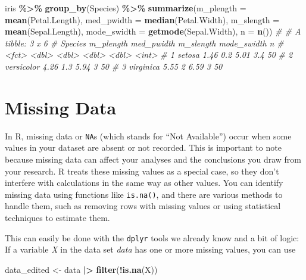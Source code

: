 \documentclass[
]{book}
\newenvironment{Shaded}{\begin{snugshade}}{\end{snugshade}}
\newcommand{\AttributeTok}[1]{\textcolor[rgb]{0.13,0.29,0.53}{#1}}
\newcommand{\CommentTok}[1]{\textcolor[rgb]{0.56,0.35,0.01}{\textit{#1}}}
\newcommand{\FunctionTok}[1]{\textcolor[rgb]{0.13,0.29,0.53}{\textbf{#1}}}
\newcommand{\NormalTok}[1]{#1}
\newcommand{\OtherTok}[1]{\textcolor[rgb]{0.56,0.35,0.01}{#1}}
\newcommand{\SpecialCharTok}[1]{\textcolor[rgb]{0.81,0.36,0.00}{\textbf{#1}}}
\begin{document}
\begin{Shaded}
\begin{Highlighting}[]
\NormalTok{iris }\SpecialCharTok{\%\textgreater{}\%} 
  \FunctionTok{group\_by}\NormalTok{(Species) }\SpecialCharTok{\%\textgreater{}\%} 
  \FunctionTok{summarize}\NormalTok{(}\AttributeTok{m\_plength =} \FunctionTok{mean}\NormalTok{(Petal.Length),}
            \AttributeTok{med\_pwidth =} \FunctionTok{median}\NormalTok{(Petal.Width),}
            \AttributeTok{m\_slength =} \FunctionTok{mean}\NormalTok{(Sepal.Length),}
            \AttributeTok{mode\_swidth =} \FunctionTok{getmode}\NormalTok{(Sepal.Width),}
            \AttributeTok{n =} \FunctionTok{n}\NormalTok{())}
\CommentTok{\# \# A tibble: 3 x 6}
\CommentTok{\#   Species    m\_plength med\_pwidth m\_slength mode\_swidth     n}
\CommentTok{\#   \textless{}fct\textgreater{}          \textless{}dbl\textgreater{}      \textless{}dbl\textgreater{}     \textless{}dbl\textgreater{}       \textless{}dbl\textgreater{} \textless{}int\textgreater{}}
\CommentTok{\# 1 setosa          1.46        0.2      5.01         3.4    50}
\CommentTok{\# 2 versicolor      4.26        1.3      5.94         3      50}
\CommentTok{\# 3 virginica       5.55        2        6.59         3      50}
\end{Highlighting}
\end{Shaded}

\section{Missing Data}\label{missing-data}

In R, missing data or \texttt{NA}s (which stands for ``Not Available'') occur when some values in your dataset are absent or not recorded.
This is important to note because missing data can affect your analyses and the conclusions you draw from your research.
R treats these missing values as a special case, so they don't interfere with calculations in the same way as other values.
You can identify missing data using functions like \texttt{is.na()}, and there are various methods to handle them, such as removing rows with missing values or using statistical techniques to estimate them.

This can easily be done with the \texttt{dplyr} tools we already know and a bit of logic:
If a variable \emph{X} in the data set \emph{data} has one or more missing values, you can use

\begin{Shaded}
\begin{Highlighting}[]
\NormalTok{data\_edited }\OtherTok{\textless{}{-}}\NormalTok{ data }\SpecialCharTok{|\textgreater{}} 
  \FunctionTok{filter}\NormalTok{(}\SpecialCharTok{!}\FunctionTok{is.na}\NormalTok{(X))}
\end{Highlighting}
\end{Shaded}
\end{document}
